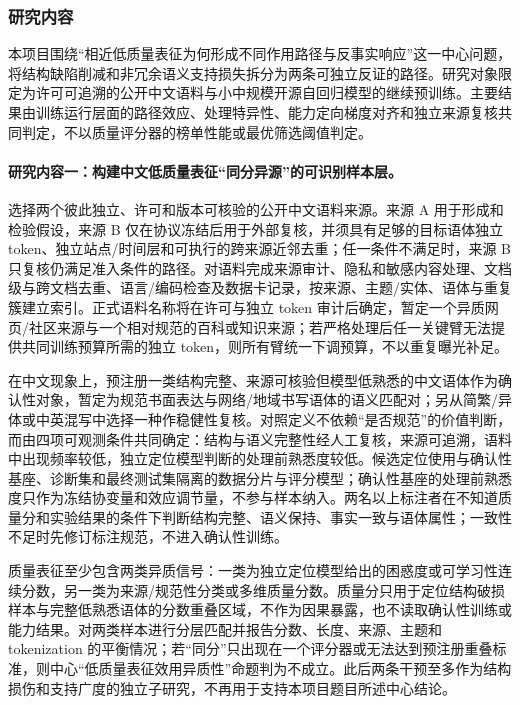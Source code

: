 \justifying
\NSFCBodyText

\subsubsection{研究内容}

本项目围绕“相近低质量表征为何形成不同作用路径与反事实响应”这一中心问题，将结构缺陷削减和非冗余语义支持损失拆分为两条可独立反证的路径。研究对象限定为许可可追溯的公开中文语料与小中规模开源自回归模型的继续预训练。主要结果由训练运行层面的路径效应、处理特异性、能力定向梯度对齐和独立来源复核共同判定，不以质量评分器的榜单性能或最优筛选阈值判定。

\paragraph{研究内容一：构建中文低质量表征“同分异源”的可识别样本层。}

选择两个彼此独立、许可和版本可核验的公开中文语料来源。来源 A 用于形成和检验假设，来源 B 仅在协议冻结后用于外部复核，并须具有足够的目标语体独立 token、独立站点/时间层和可执行的跨来源近邻去重；任一条件不满足时，来源 B 只复核仍满足准入条件的路径。对语料完成来源审计、隐私和敏感内容处理、文档级与跨文档去重、语言/编码检查及数据卡记录，按来源、主题/实体、语体与重复簇建立索引。正式语料名称将在许可与独立 token 审计后确定，暂定一个异质网页/社区来源与一个相对规范的百科或知识来源；若严格处理后任一关键臂无法提供共同训练预算所需的独立 token，则所有臂统一下调预算，不以重复曝光补足。

在中文现象上，预注册一类结构完整、来源可核验但模型低熟悉的中文语体作为确认性对象，暂定为规范书面表达与网络/地域书写语体的语义匹配对；另从简繁/异体或中英混写中选择一种作稳健性复核。对照定义不依赖“是否规范”的价值判断，而由四项可观测条件共同确定：结构与语义完整性经人工复核，来源可追溯，语料中出现频率较低，独立定位模型判断的处理前熟悉度较低。候选定位使用与确认性基座、诊断集和最终测试集隔离的数据分片与评分模型；确认性基座的处理前熟悉度只作为冻结协变量和效应调节量，不参与样本纳入。两名以上标注者在不知道质量分和实验结果的条件下判断结构完整、语义保持、事实一致与语体属性；一致性不足时先修订标注规范，不进入确认性训练。

质量表征至少包含两类异质信号：一类为独立定位模型给出的困惑度或可学习性连续分数，另一类为来源/规范性分类或多维质量分数\cite{zhuang2025metarater,bai2025multiactor,xu2025fire,ali2025jql}。质量分只用于定位结构破损样本与完整低熟悉语体的分数重叠区域，不作为因果暴露，也不读取确认性训练或能力结果。对两类样本进行分层匹配并报告分数、长度、来源、主题和 tokenization 的平衡情况；若“同分”只出现在一个评分器或无法达到预注册重叠标准，则中心“低质量表征效用异质性”命题判为不成立。此后两条干预至多作为结构损伤和支持广度的独立子研究，不再用于支持本项目题目所述中心结论。

